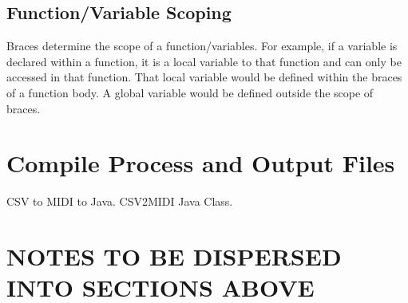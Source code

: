 \documentclass[letterpaper]{article}
\begin{document}
\subsection{Function/Variable Scoping}
Braces determine the scope of a function/variables. For example, if a variable is declared within a function, it is a local variable to that function and can only be accessed in that function. That local variable would be defined within the braces of a function body. A global variable would be defined outside the scope of braces.

\section{Compile Process and Output Files}
CSV to MIDI to Java. CSV2MIDI Java Class. 







\section{NOTES TO BE DISPERSED INTO SECTIONS ABOVE}
\end{document}
